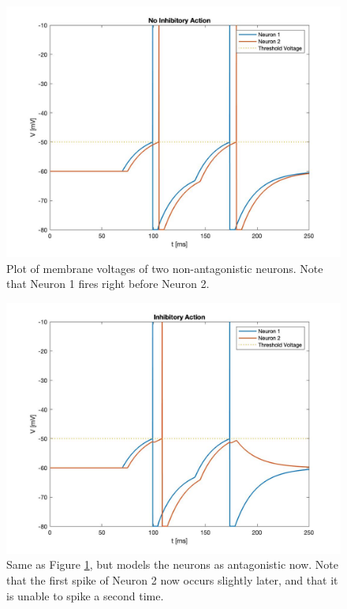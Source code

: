 \documentclass{article}
\begin{document}
\begin{figure}[!htb]
    \centering
    \includegraphics[scale=0.25]{final_paper/noinhib.jpg}
    \caption{Plot of membrane voltages of two non-antagonistic neurons. Note that Neuron 1 fires right before Neuron 2.}
    \label{fig:noinhib}
\end{figure}
\begin{figure}[!htb]
    \centering
    \includegraphics[scale=0.25]{final_paper/inhib.jpg}
    \caption{Same as Figure \ref{fig:noinhib}, but models the neurons as antagonistic now. Note that the first spike of Neuron 2 now occurs slightly later, and that it is unable to spike a second time.}
    \label{fig:inhib}
\end{figure}
\end{document}
